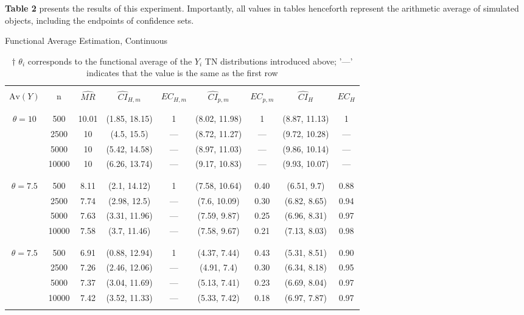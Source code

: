 \documentclass[12pt]{amsart}
\theoremstyle{plain}%
\theoremstyle{definition}
\theoremstyle{remark}
\numberwithin{equation}{section}
\begin{document}
\textbf{Table 2} presents the results of this experiment. Importantly, all values in tables henceforth represent the arithmetic average of simulated objects, including the endpoints of confidence sets.
\begin{table}[H]
\caption{Functional Average Estimation, Continuous}
\centering
\begin{adjustbox}{width=1\textwidth}
\begin{tabular}{ccc|cc|cc|cc}
  \hline
     \\[-3.5\smallskipamount]
$\text{Av}(Y)$ & n & $\hat{MR}$ & $\hat{CI}_{H, m}$ & $EC_{H, m}$ & $\hat{CI}_{p, m}$ & $EC_{p, m}$ & $\hat{CI}_{H}$ & $EC_{H}$ \\ 
   \\[-3.5\smallskipamount]
  \hline
     \\[-3.5\smallskipamount]
$\theta = 10$ & 500 & 10.01 & (1.85, 18.15) & 1 & (8.02, 11.98) & 1 & (8.87, 11.13) & 1 \\ 
   & 2500 & 10 & (4.5, 15.5) & --- & (8.72, 11.27) & --- & (9.72, 10.28) & --- \\ 
   & 5000 & 10 & (5.42, 14.58) & --- & (8.97, 11.03) & --- & (9.86, 10.14) & --- \\ 
   & 10000 & 10 & (6.26, 13.74) & --- & (9.17, 10.83) & --- & (9.93, 10.07) & --- \\
      \\[-3.5\smallskipamount]
   \hline 
      \\[-3.5\smallskipamount]
 $\theta = 7.5$  & 500 & 8.11 & (2.1, 14.12) & 1 & (7.58, 10.64) & 0.40 & (6.51, 9.7) & 0.88 \\ 
   & 2500 & 7.74 & (2.98, 12.5) & --- & (7.6, 10.09) & 0.30 & (6.82, 8.65) & 0.94 \\ 
   & 5000 & 7.63 & (3.31, 11.96) & --- & (7.59, 9.87) & 0.25 & (6.96, 8.31) & 0.97 \\ 
   & 10000 & 7.58 & (3.7, 11.46) & --- & (7.58, 9.67) & 0.21 & (7.13, 8.03) & 0.98 \\ 
      \\[-3.5\smallskipamount]
   \hline
      \\[-3.5\smallskipamount]
 $\theta = 7.5$  & 500 & 6.91 & (0.88, 12.94) & 1 & (4.37, 7.44) & 0.43 & (5.31, 8.51) & 0.90 \\ 
   & 2500 & 7.26 & (2.46, 12.06) & --- & (4.91, 7.4) & 0.30 & (6.34, 8.18) & 0.95 \\ 
   & 5000 & 7.37 & (3.04, 11.69) & --- & (5.13, 7.41) & 0.23 & (6.69, 8.04) & 0.97 \\ 
   & 10000 & 7.42 & (3.52, 11.33) & --- & (5.33, 7.42) & 0.18 & (6.97, 7.87) & 0.97 \\ 
      \\[-3.5\smallskipamount]
   \hline
\end{tabular}
\end{adjustbox}
\caption*{\small $\dagger$ $\theta_i$ corresponds to the functional average of the $Y_i$ TN distributions introduced above; '---' indicates that the value is the same as the first row}
\end{table}
\end{document}
